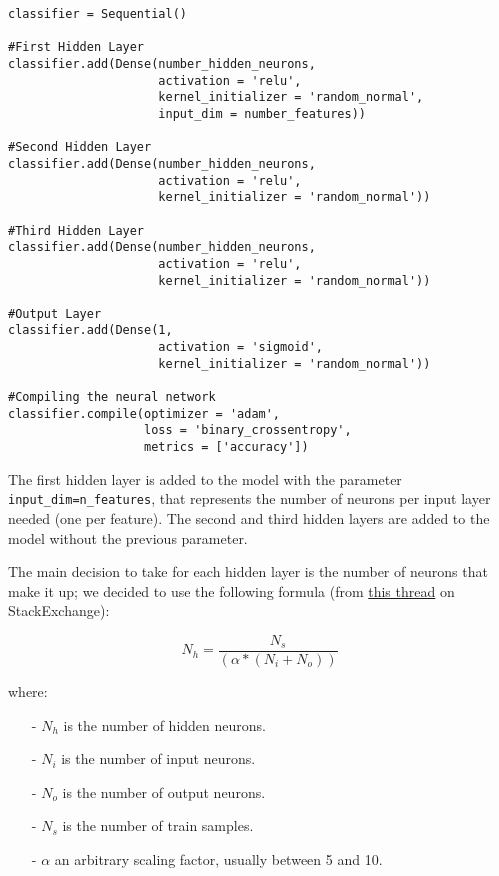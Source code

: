 \begin{lstlisting}[caption={Neural Network model},label={lst:nn-model}]
classifier = Sequential()

#First Hidden Layer
classifier.add(Dense(number_hidden_neurons, 
                     activation = 'relu', 
                     kernel_initializer = 'random_normal', 
                     input_dim = number_features))

#Second Hidden Layer
classifier.add(Dense(number_hidden_neurons, 
                     activation = 'relu', 
                     kernel_initializer = 'random_normal'))

#Third Hidden Layer
classifier.add(Dense(number_hidden_neurons, 
                     activation = 'relu', 
                     kernel_initializer = 'random_normal'))

#Output Layer
classifier.add(Dense(1, 
                     activation = 'sigmoid', 
                     kernel_initializer = 'random_normal'))

#Compiling the neural network
classifier.compile(optimizer = 'adam', 
                   loss = 'binary_crossentropy', 
                   metrics = ['accuracy'])
\end{lstlisting}

The first hidden layer is added to the model with the parameter \texttt{input\_dim=n\_features}, that represents the number of neurons per input layer needed (one per feature). The second and third hidden layers are added to the model without the previous parameter.

The main decision to take for each hidden layer is the number of neurons that make it up; we decided to use the following formula (from \href{https://stats.stackexchange.com/questions/181/how-to-choose-the-number-of-hidden-layers-and-nodes-in-a-feedforward-neural-netw}{this thread} on StackExchange):

\begin{equation}
N_h = \frac{N_s}{(\alpha * (N_i + N_o))}
\end{equation}

where:
\begin{itemize}
	
	\item[-] $N_h$ is the number of hidden neurons.
	
	\item[-] $N_i$ is the number of input neurons.
	
	\item[-] $N_o$ is the number of output neurons.
	
	\item[-] $N_s$ is the number of train samples.
	
	\item[-] $\alpha$ an arbitrary scaling factor, usually between 5 and 10.  
	
\end{itemize}

